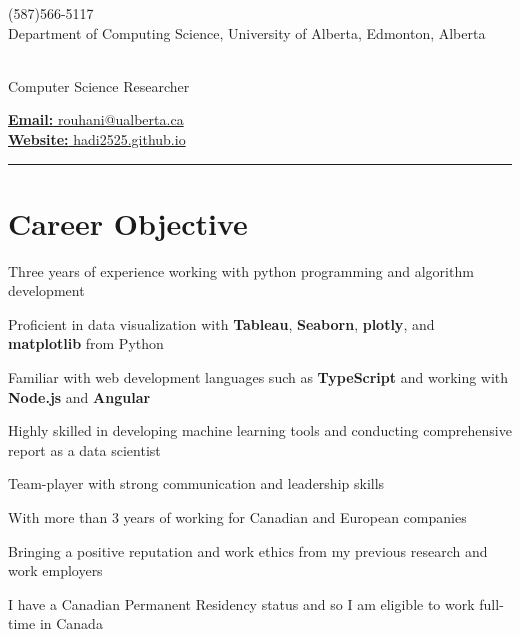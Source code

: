 \documentclass[letter,11pt]{article}
\author{Hadi Rohani} %
\makeatletter
\def\phone{(587)566-5117}
\def\city{Department of Computing Science, University of Alberta, Edmonton, Alberta}
\def\email{rouhani@ualberta.ca}
\def\Web{hadi2525.github.io}
\def\role{Computer Science Researcher} %
\makeatother
\begin{document}
\begin{center}
	\begin{minipage}[b]{.3\textwidth}
		\raggedright
		{\large \phone} \\ %
		{\city} %
		
	\end{minipage}%
	\begin{minipage}[b]{.4\textwidth}
		\makeatletter
		\centering {\HUGE \@author} \\
		\makeatother
		\vspace{.5em}
		{\color{highlight} \Large{\role}}
	\end{minipage}%
	\begin{minipage}[b]{.3\textwidth}
		\raggedleft 
		\href{mailto:\email}{\textbf{Email:} \email}\\ 
		\href{https://hadi2525.github.io/\Web}{\textbf{Website:} \Web}
	\end{minipage}
	
	{\color{highlight} \hrule}
\end{center}
\section{Career Objective}
\begin{zitemize}
	\item Three years of experience working with python programming and algorithm development
	\item Proficient in data visualization with \textbf{Tableau}, \textbf{Seaborn}, \textbf{plotly}, and \textbf{matplotlib} from Python
	\item Familiar with web development languages such as \textbf{TypeScript} and working with \textbf{Node.js} and \textbf{Angular}
	\item Highly skilled in developing machine learning tools and conducting comprehensive report as a data scientist
	\item Team-player with strong communication and leadership skills
	\item With more than 3 years of working for Canadian and European companies
	\item Bringing a positive reputation and work ethics from my previous research and work employers
	\item I have a Canadian Permanent Residency status and so I am eligible to work full-time in Canada
\end{zitemize}
\end{document}
